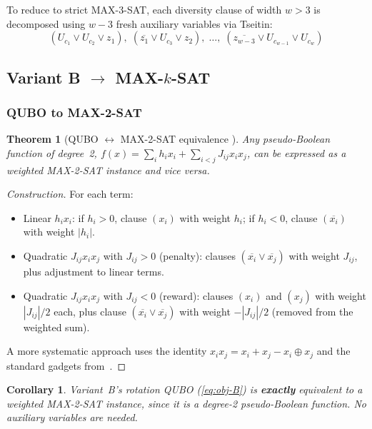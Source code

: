 \documentclass[11pt,a4paper]{article}
\newtheorem{theorem}{Theorem}
\newtheorem{corollary}{Corollary}
\begin{document}
To reduce to strict MAX-3-SAT, each diversity clause of width $w > 3$ is
decomposed using $w - 3$ fresh auxiliary variables via Tseitin:
\[
(U_{c_1} \lor U_{c_2} \lor z_1), \;
(\overline{z_1} \lor U_{c_3} \lor z_2), \;
\ldots, \;
(\overline{z_{w-3}} \lor U_{c_{w-1}} \lor U_{c_w})
\]

\subsection{Variant B $\to$ MAX-$k$-SAT}

\subsubsection*{QUBO to MAX-2-SAT}

\begin{theorem}[QUBO $\leftrightarrow$ MAX-2-SAT equivalence {\cite{boros2002pseudo}}]
Any pseudo-Boolean function of degree~2, $f(x) = \sum_i h_i x_i + \sum_{i<j} J_{ij} x_i x_j$,
can be expressed as a weighted MAX-2-SAT instance and vice versa.
\end{theorem}

\begin{proof}[Construction]
For each term:
\begin{itemize}
  \item Linear $h_i x_i$: if $h_i > 0$, clause $(x_i)$ with weight $h_i$;
    if $h_i < 0$, clause $(\overline{x_i})$ with weight $|h_i|$.
  \item Quadratic $J_{ij} x_i x_j$ with $J_{ij} > 0$ (penalty):
    clauses $(\overline{x_i} \lor \overline{x_j})$ with weight $J_{ij}$,
    plus adjustment to linear terms.
  \item Quadratic $J_{ij} x_i x_j$ with $J_{ij} < 0$ (reward):
    clauses $(x_i)$ and $(x_j)$ with weight $|J_{ij}|/2$ each,
    plus clause $(\overline{x_i} \lor \overline{x_j})$ with weight $-|J_{ij}|/2$
    (removed from the weighted sum).
\end{itemize}
A more systematic approach uses the identity
$x_i x_j = x_i + x_j - x_i \oplus x_j$ and the standard
gadgets from~\cite{boros2002pseudo}.
\end{proof}

\begin{corollary}
Variant~B's rotation QUBO (\ref{eq:obj-B}) is \textbf{exactly} equivalent to a
weighted MAX-2-SAT instance, since it is a degree-2 pseudo-Boolean function.
No auxiliary variables are needed.
\end{corollary}
\end{document}
